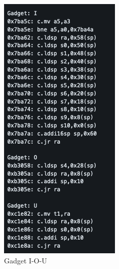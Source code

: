 \begin{figure}[!htb]
  \includegraphics[width=\linewidth]{images/gadget-2.png}
  \caption{Gadget I-O-U}
\endminipage
\end{figure}
